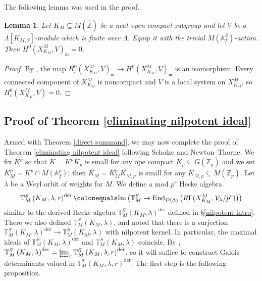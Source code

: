 \documentclass{amsart}
\newtheorem{lemma}[subsubsection]{Lemma}
\theoremstyle{remark}
\numberwithin{equation}{subsection}
\newcommand{\A}{\AA}
\newcommand{\Z}{\ZZ}
\newcommand{\m}{\frakm}
\renewcommand{\AA}{{\mathbb A}}
\newcommand{\ZZ}{{\mathbb Z}}
\newcommand{\cV}{{\mathcal V}}
\newcommand{\frakm}{\mathfrak{m}}
\newcommand{\Zp}{\Z_p}
\newcommand{\sub}{\subseteq}
\newcommand{\defeq}{\colonequals}
\renewcommand{\(}{\left(}
\renewcommand{\)}{\right)}
\begin{document}
The following lemma was used in the proof.

\begin{lemma}\label{eliminating degree 0} Let $K_M\sub M(\widehat{\Z})$ be a neat open compact subgroup and let $V$ be a $\Lambda[K_{M,S}]$-module which is finite over $\Lambda$. Equip it with the trivial $M(\A_f^S)$-action. Then $H^0(X^M_{K_M},V)_{\m} = 0$.
\end{lemma}

\begin{proof}
By \cite[Thm.\ 4.2]{newton-thorne}, the map $H^0_c(X^M_{K_M},V)_{\m} \to H^0(X^M_{K_M},V)_{\m}$ is an isomorphism. Every connected component of $X^M_{K_M}$ is noncompact and $V$ is a local system on $X_{K_M}^M$, so $H^0_c(X^M_{K_M},V)=0$.
\end{proof}

\subsection{Proof of Theorem \ref{eliminating nilpotent ideal}}\label{determinants 2}

Armed with Theorem \ref{direct summand}, we may now complete the proof of Theorem \ref{eliminating nilpotent ideal} following Scholze and Newton--Thorne. We fix $K^p$ so that $K=K^pK_p$ is small for any ope compact $K_p \sub G(\Zp)$ and we set $K^p_M = K^p \cap M(\A_f^p)$; then $K_M = K_M^p K_{M,p}$ is small for any $K_{M,p}\sub M(\Zp)$. Let $\lambda$ be a Weyl orbit of weights for $M$. We define a mod $p^r$ Hecke algebra
\[
\mathbb{T}^S_{M}\left(K_M,\lambda,r\right)^\mathrm{der}\defeq \mathrm{Im}\left(\mathbb{T}^S_{M}\to \mathrm{End}_{D(\Lambda)}\left(R\Gamma(X^M_{K_M}, \cV_\lambda/p^r)\right)\right)
\] 
similar to the derived Hecke algebra $\mathbb{T}^S_{M}\left(K_M,\lambda\right)^\mathrm{der}$ defined in \S \ref{nilpotent intro}. There we also defined $\mathbb{T}^S_{M}\left(K_M,\lambda\right)$, and noted that there is a surjection $\mathbb{T}^S_{M}\left(K_M,\lambda\right)^\mathrm{der} \to \mathbb{T}^S_{M}\left(K_M,\lambda\right)$ with nilpotent kernel. In particular, the maximal ideals of  $\mathbb{T}^S_{M}\left(K_M,\lambda\right)^\mathrm{der}$ and $\mathbb{T}^S_{M}\left(K_M,\lambda\right)$ coincide. By \cite[Lemma 3.11]{newton-thorne}, $\mathbb{T}^S_{M}\left(K_M,\lambda\right)^\mathrm{der} = \varprojlim_r \mathbb{T}^S_{M}\left(K_M,\lambda,r\right)^\mathrm{der}$, so it will suffice to construct Galois determinants valued in $\mathbb{T}^S_{M}\left(K_M,\lambda,r\right)^\mathrm{der}$. The first step is the following proposition.
\end{document}
